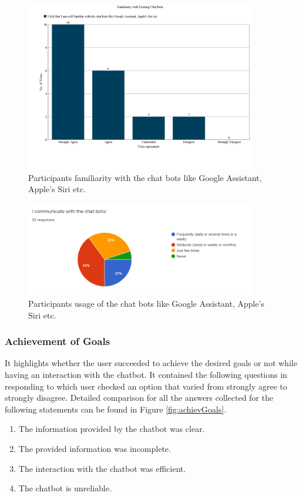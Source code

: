 \begin{figure}[!h]
    \centering
    \includegraphics[width=0.9\textwidth]{img/Familiraity_Updated.PNG}
    \caption{Participants familiarity with the chat bots like Google Assistant, Apple's Siri etc.}
    \label{fig:familiarity}
\end{figure}

\begin{figure}[!h]
    \centering
    \includegraphics[width=0.9\textwidth]{img/Communicate_Chatbots_Result.PNG}
    \caption{Participants usage of the chat bots like Google Assistant, Apple's Siri etc.}
    \label{fig:commChatRes}
\end{figure}

\subsubsection*{Achievement of Goals}
It highlights whether the user succeeded to achieve the desired goals or not while having an interaction with the chatbot. It contained the following questions in responding to which user checked an option that varied from strongly agree to strongly disagree. Detailed comparison for all the answers collected for the following statements can be found in Figure \ref{fig:achievGoals}.
\begin{enumerate}
    \item The information provided by the chatbot was clear.
    \item The provided information was incomplete.
    \item The interaction with the chatbot was efficient.
    \item The chatbot is unreliable.
\end{enumerate}

